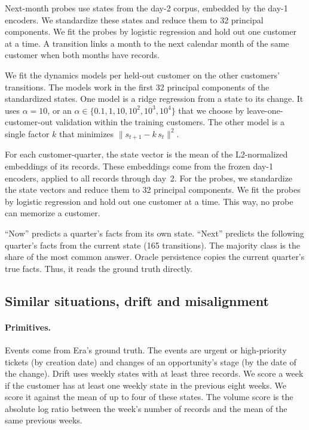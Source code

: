 \documentclass[11pt]{article}
\begin{document}
Next-month probes use states from the day-2 corpus, embedded by the day-1 encoders. We standardize these states and reduce them to 32 principal components. We fit the probes by logistic regression and hold out one customer at a time. A transition links a month to the next calendar month of the same customer when both months have records.

We fit the dynamics models per held-out customer on the other customers' transitions. The models work in the first 32 principal components of the standardized states. One model is a ridge regression from a state to its change. It uses $\alpha = 10$, or an $\alpha \in \{0.1, 1, 10, 10^2, 10^3, 10^4\}$ that we choose by leave-one-customer-out validation within the training customers. The other model is a single factor $k$ that minimizes $\lVert s_{t+1} - k\, s_t \rVert^2$.

For each customer-quarter, the state vector is the mean of the L2-normalized embeddings of its records. These embeddings come from the frozen day-1 encoders, applied to all records through day~2. For the probes, we standardize the state vectors and reduce them to 32 principal components. We fit the probes by logistic regression and hold out one customer at a time. This way, no probe can memorize a customer.

``Now'' predicts a quarter's facts from its own state. ``Next'' predicts the following quarter's facts from the current state (165 transitions). The majority class is the share of the most common answer. Oracle persistence copies the current quarter's true facts. Thus, it reads the ground truth directly.

\subsection{Similar situations, drift and misalignment}
\paragraph{Primitives.} Events come from Era's ground truth. The events are urgent or high-priority tickets (by creation date) and changes of an opportunity's stage (by the date of the change). Drift uses weekly states with at least three records. We score a week if the customer has at least one weekly state in the previous eight weeks. We score it against the mean of up to four of these states. The volume score is the absolute log ratio between the week's number of records and the mean of the same previous weeks.
\end{document}
